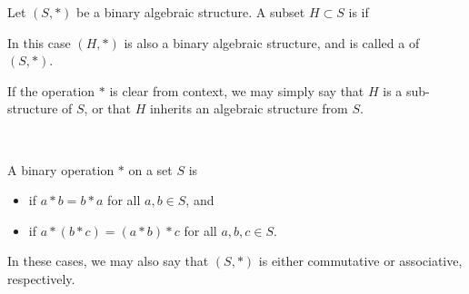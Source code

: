 \documentclass[11pt,fleqn,dvipsnames,usenames]{article}
\newcommand{\p}{\noindent}
\begin{document}
\begin{definition}
Let $(S,*)$ be a binary algebraic structure.  A subset $H\subset S$ is  if
\vspace{1.5cm}

\p In this case $\left(H,*\right)$ is also a binary algebraic structure, and is called a  of $(S,*)$.
\end{definition}
\vspace{1cm}

%
\terminology If the operation $*$ is clear from context, we may simply say that $H$ is a sub-structure of $S$, or that $H$ inherits an algebraic structure from $S$.

\begin{examples*}~
\vfill

\end{examples*}

\begin{definition}
A binary operation $*$ on a set $S$ is
\begin{itemize}
\item {} if $a*b = b*a$ for all $a,b\in S$, and
\item {} if $a*(b*c) = (a*b)*c$ for all $a,b,c\in S$.
\end{itemize}
\p In these cases, we may also say that $(S,*)$ is either commutative or associative, respectively.
\end{definition}
\newpage
%
\begin{examples*}~
\end{examples*}
\end{document}
